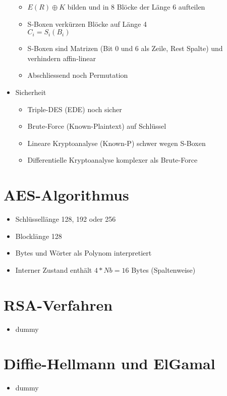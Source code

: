 \documentclass[11pt, paper=a4, twocolumn]{scrartcl}
\begin{document}
\begin{itemize}
\begin{itemize}
					\item $E(R)\oplus K$ bilden und in 8 Blöcke der Länge 6 aufteilen
					\item S-Boxen verkürzen Blöcke auf Länge 4\\
						$C_i=S_i(B_i)$
					\item S-Boxen sind Matrizen (Bit 0 und 6 als Zeile, Rest Spalte) und verhindern affin-linear
					\item Abschliessend noch Permutation
				\end{itemize}
			\item Sicherheit
				\begin{itemize}
					\item Triple-DES (EDE) noch sicher
					\item Brute-Force (Known-Plaintext) auf Schlüssel
					\item Lineare Kryptoanalyse (Known-P) schwer wegen S-Boxen
					\item Differentielle Kryptoanalyse komplexer als Brute-Force
				\end{itemize}
		\end{itemize}
	
	\section{AES-Algorithmus}
		\begin{itemize}
			\item Schlüssellänge 128, 192 oder 256
			\item Blocklänge 128
			\item Bytes und Wörter als Polynom interpretiert
			\item Interner Zustand enthält $4*Nb=16$ Bytes (Spaltenweise)
		\end{itemize}
	
	\section{RSA-Verfahren}
		\begin{itemize}
			\item dummy
		\end{itemize}
	
	\section{Diffie-Hellmann und ElGamal}
		\begin{itemize}
			\item dummy
		\end{itemize}
	
\end{document}
